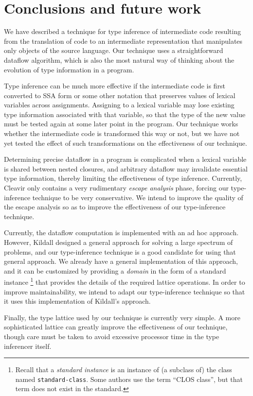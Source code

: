 \section{Conclusions and future work}

We have described a technique for type inference of intermediate code
resulting from the translation of \commonlisp{} code to an
intermediate representation that manipulates only objects of the
source language.  Our technique uses a straightforward dataflow
algorithm, which is also the most natural way of thinking about the
evolution of type information in a \commonlisp{} program.

Type inference can be much more effective if the intermediate code is
first converted to SSA form \cite{Cytron:1989:EMC:75277.75280,
  Cytron:1991:ECS:115372.115320} or some other notation that preserves
values of lexical variables across assignments.  Assigning to a
lexical variable may lose existing type information associated with
that variable, so that the type of the new value must be tested again
at some later point in the program.  Our technique works whether the
intermediate code is transformed this way or not, but we have not yet
tested the effect of such transformations on the effectiveness of our
technique.

Determining precise dataflow in a \commonlisp{} program is complicated
when a lexical variable is shared between nested closures, and
arbitrary dataflow may invalidate essential type information, thereby
limiting the effectiveness of type inference.  Currently, Cleavir only
contains a very rudimentary \emph{escape analysis} phase, forcing our
type-inference technique to be very conservative.  We intend to
improve the quality of the escape analysis so as to improve the
effectiveness of our type-inference technique.

Currently, the dataflow computation is implemented with an ad hoc
approach.  However, Kildall \cite{Kildall:1973:UAG:512927.512945}
designed a general approach for solving a large spectrum of problems,
and our type-inference technique is a good candidate for using that
general approach.  We already have a general implementation of this
approach, and it can be customized by providing a \emph{domain} in the
form of a standard instance%
\footnote{Recall that a \emph{standard instance} is an instance of
  (a subclass of) the class named \texttt{standard-class}.  Some
  authors use the term ``CLOS class'', but that term does not exist in
  the \commonlisp{} standard.}
that provides the details of the required lattice operations.  In
order to improve maintainability, we intend to adapt our
type-inference technique so that it uses this implementation of
Kildall's approach.

Finally, the type lattice used by our technique is currently very
simple.  A more sophisticated lattice can greatly improve the
effectiveness of our technique, though care must be taken to avoid
excessive processor time in the type inferencer itself.
